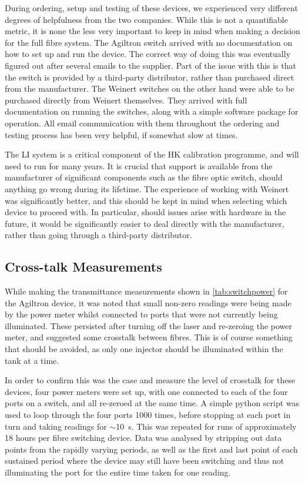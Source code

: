 \documentclass[a4paper,11pt]{article}
\let\oldsim\sim
\renewcommand{\sim}{{\oldsim}}
\begin{document}
During ordering, setup and testing of these devices, we experienced very different degrees of helpfulness from the two companies. While this is not a quantifiable metric, it is none the less very important to keep in mind when making a decision for the full fibre system. The Agiltron switch arrived with no documentation on how to set up and run the device. The correct way of doing this was eventually figured out after several emails to the supplier. Part of the issue with this is that the switch is provided by a third-party distributor, rather than purchased direct from the manufacturer. The Weinert switches on the other hand were able to be purchased directly from Weinert themselves. They arrived with full documentation on running the switches, along with a simple software package for operation. All email communication with them throughout the ordering and testing process has been very helpful, if somewhat slow at times.

The LI system is a critical component of the HK calibration programme, and will need to run for many years. It is crucial that support is available from the manufacturer of significant components such as the fibre optic switch, should anything go wrong during its lifetime. The experience of working with Weinert was significantly better, and this should be kept in mind when selecting which device to proceed with. In particular, should issues arise with hardware in the future, it would be significantly easier to deal directly with the manufacturer, rather than going through a third-party distributor.


\subsection{Cross-talk Measurements}

While making the transmittance measurements shown in \cref{tab:switchpower} for the Agiltron device, it was noted that small non-zero readings were being made by the power meter whilst connected to ports that were not currently being illuminated. These persisted after turning off the laser and re-zeroing the power meter, and suggested some crosstalk between fibres. This is of course something that should be avoided, as only one injector should be illuminated within the tank at a time.

In order to confirm this was the case and measure the level of crosstalk for these devices, four power meters were set up, with one connected to each of the four ports on a switch, and all re-zeroed at the same time. A simple python script was used to loop through the four ports 1000 times, before stopping at each port in turn and taking readings for $\sim$10~s. This was repeated for runs of approximately 18 hours per fibre switching device. Data was analysed by stripping out data points from the rapidly varying periods, as well as the first and last point of each sustained period where the device may still have been switching and thus not illuminating the port for the entire time taken for one reading.
\end{document}
